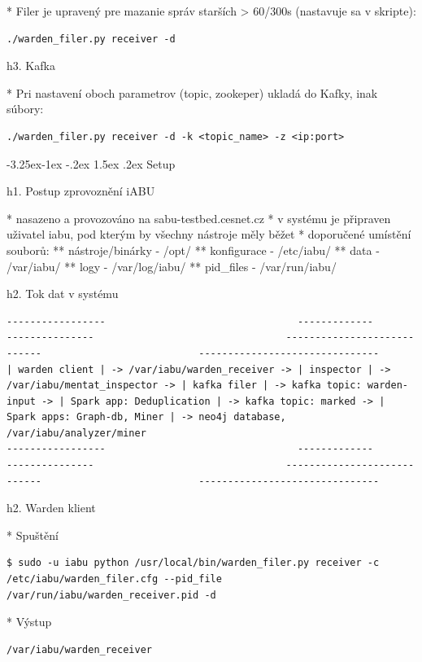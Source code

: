 \documentclass[a4paper]{article} %
\makeatletter
\renewcommand\subsection{\@startsection{subsection}{2}{\z@}%
                   {-3.25ex\@plus -1ex \@minus -.2ex}%
                   {1.5ex \@plus .2ex}%
                   {\normalfont\sffamily\large\bfseries\color{projectcolor}}}
\makeatother
\begin{document}
* Filer je upravený pre mazanie správ starších > 60/300s (nastavuje sa v skripte):
\begin{lstlisting}[]./warden_filer.py receiver -d\end{lstlisting}


h3. Kafka

* Pri nastavení oboch parametrov (topic, zookeper) ukladá do Kafky, inak súbory:
\begin{lstlisting}[]./warden_filer.py receiver -d -k <topic_name> -z <ip:port>\end{lstlisting}

\subsection{Setup}

h1. Postup zprovoznění iABU

* nasazeno a provozováno na sabu-testbed.cesnet.cz
* v systému je připraven uživatel iabu, pod kterým by všechny nástroje měly běžet
* doporučené umístění souborů:
** nástroje/binárky - /opt/
** konfigurace - /etc/iabu/
** data - /var/iabu/
** logy - /var/log/iabu/
** pid\_files - /var/run/iabu/

h2. Tok dat v systému

\begin{lstlisting}[]
-----------------                                 -------------                                  ---------------                                 ----------------------------                           -------------------------------
| warden client | -> /var/iabu/warden_receiver -> | inspector | -> /var/iabu/mentat_inspector -> | kafka filer | -> kafka topic: warden-input -> | Spark app: Deduplication | -> kafka topic: marked -> | Spark apps: Graph-db, Miner | -> neo4j database, /var/iabu/analyzer/miner
-----------------                                 -------------                                  ---------------                                 ----------------------------                           -------------------------------
\end{lstlisting}

h2. Warden klient

* Spuštění
\begin{lstlisting}[]
$ sudo -u iabu python /usr/local/bin/warden_filer.py receiver -c /etc/iabu/warden_filer.cfg --pid_file /var/run/iabu/warden_receiver.pid -d
\end{lstlisting}

* Výstup
\begin{lstlisting}[]
/var/iabu/warden_receiver
\end{lstlisting}
\end{document}
